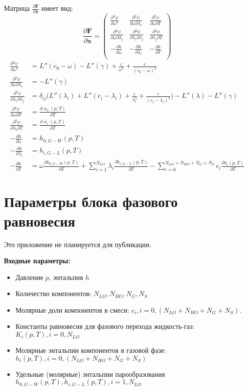\documentclass[12pt]{article}
\newcommand{\pd}[2]{\frac{\partial #1}{\partial #2}}
\begin{document}
Матрица $\pd{\mathbf{F}}{\mathbf{x}}$ имеет вид:
\[
\pd{\mathbf{F}}{\mathbf{x}} = 
\begin{pmatrix}
\pd{{}^2\psi}{\omega^2} & \pd{{}^2\psi}{\omega \partial \lambda_i} & \pd{{}^2
\psi}{\omega \partial T}\\
\pd{{}^2\psi}{\omega \partial \lambda_j} & \pd{{}^2\psi}{\lambda_i \partial
\lambda_j} & \pd{{}^2
\psi}{\lambda_j \partial T}\\
-\pd{h}{\omega} & -\pd{h}{\lambda_i} & -\pd{h}{T}\\
\end{pmatrix}
\]
\begin{align*}
\pd{{}^2\psi}{\omega^2} &= L''(c_0 - \omega) - L''(\gamma) +
\frac{\varepsilon}{\omega^2} + \frac{\varepsilon}{(c_0 - \omega)^2}\\
\pd{{}^2\psi}{\omega \partial \lambda_i} &= - L''(\gamma)\\
\pd{{}^2\psi}{\lambda_i \partial \lambda_j} &=
\delta_{ij} \Big(L''(\lambda_i) + L''(c_i - \lambda_i) +
\frac{\varepsilon}{\lambda_i^2} + \frac{\varepsilon}{(c_i - \lambda_i)^2}\Big) - L''(\lambda) 
- L''(\gamma)\\
\pd{{}^2\psi}{\omega \partial T} &= \pd{\varkappa_0(p, T)}{T} \\
\pd{{}^2\psi}{\lambda_i \partial T} &= \pd{\varkappa_i(p, T)}{T}\\
-\pd{h}{\omega} &= h_{0, G-W}(p, T)\\
-\pd{h}{\lambda_i} &= h_{i, G-L}(p, T)\\
-\pd{h}{T} &=
\omega \pd{h_{0,G-W}(p,T)}{T}
+\sum_{i=1}^{N_{LO}} \lambda_i \pd{h_{i,G-L}(p,T)}{T}
-\sum_{i=0}^{N_{LO}+N_{HO}+N_{G}+N_{S}} c_i \pd{h_i(p,T)}{T}
\end{align*}

\section{Параметры блока фазового равновесия}
Это приложение не планируется для публикации.

\textbf{Входные параметры:}
\begin{itemize}
\item Давление $p$, энтальпия $h$
\item Количество компонентов: $N_{LO}, N_{HO}, N_G, N_S$
\item Молярные доли компонентов в смеси: $c_i, i=0,(N_{LO} + N_{HO} + N_G + N_S)$.
\item Константы равновесия для фазового перехода жидкость-газ: $K_i(p,T), i=0,N_{LO}$
\item Молярные энтальпии компонентов в газовой фазе: $h_i(p, T), i=0,(N_{LO} + N_{HO} + N_G + N_S)$
\item Удельные (молярные) энтальпии парообразования $h_{0,G-W}(p, T), h_{i,G-L}(p, T), i=1,N_{LO}$
\end{itemize}
\end{document}
